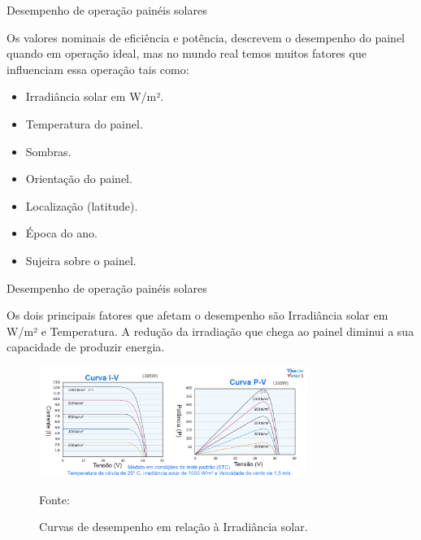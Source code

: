 \documentclass{beamer}
\begin{document}
\begin{frame}{Desempenho de operação painéis solares}

Os valores nominais de eficiência e potência, descrevem o desempenho do painel quando em operação ideal, mas no mundo real temos muitos fatores que influenciam essa operação tais como:

\begin{itemize}
  \item Irradiância solar em W/m².

  \item Temperatura do painel.
  
  \item Sombras.
  
  \item Orientação do painel.
  
  \item Localização (latitude).
  
  \item Época do ano.
  
  \item Sujeira sobre o painel.
\end{itemize}

\end{frame}


\begin{frame}{Desempenho de operação painéis solares}

Os dois principais fatores que afetam o desempenho são Irradiância solar em W/m² e Temperatura. A redução da irradiação que chega ao painel diminui a sua capacidade de produzir energia.

\begin{figure}[H]
    \centering
    \includegraphics[width=0.775\textwidth]{./Figuras/pv_luz.png}
    \caption{Curvas de desempenho em relação à Irradiância solar.}{Fonte: \cite{cleanenergyreviews}}
   \label{fig:pv_luz}
\end{figure}

\end{frame}
\end{document}
